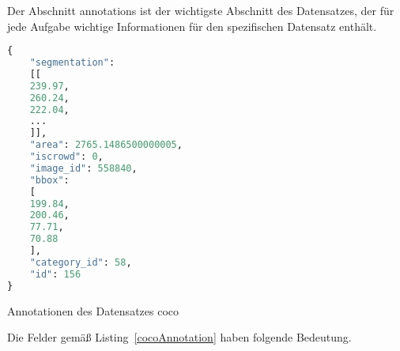 \bigskip

Der Abschnitt annotations ist der wichtigste Abschnitt des Datensatzes, der für jede Aufgabe wichtige Informationen für den spezifischen Datensatz enthält.

\begin{code}
    \begin{lstlisting}[language=python]
{
    "segmentation":
    [[
    239.97,
    260.24,
    222.04,
    ...
    ]],
    "area": 2765.1486500000005,
    "iscrowd": 0,
    "image_id": 558840,
    "bbox":
    [
    199.84,
    200.46,
    77.71,
    70.88
    ],
    "category_id": 58,
    "id": 156
}
\end{lstlisting}
\caption{Annotationen des Datensatzes \ac{coco}}\label{cocoAnnotation}
\end{code}

Die Felder gemäß Listing~\ref{cocoAnnotation} haben folgende Bedeutung.

